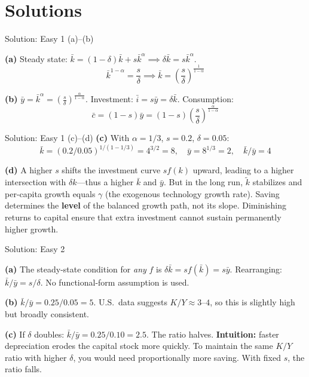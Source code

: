 \documentclass[aspectratio=169,10pt]{beamer}
\newcommand{\backbutton}[1]{\hfill\hyperlink{#1}{\beamerbutton{Back}}}
\begin{document}

\appendix
\section{Solutions}

\begin{frame}{Solution: Easy 1 (a)--(b)}
\hypertarget{s-e1}{}

\textbf{(a)} Steady state: $\bar{k} = (1-\delta)\bar{k} + s\bar{k}^\alpha \implies \delta\bar{k} = s\bar{k}^\alpha$.
\[
\bar{k}^{1-\alpha} = \frac{s}{\delta} \implies \boxed{\bar{k} = \left(\frac{s}{\delta}\right)^{\frac{1}{1-\alpha}}}
\]

\textbf{(b)} $\bar{y} = \bar{k}^\alpha = \left(\frac{s}{\delta}\right)^{\frac{\alpha}{1-\alpha}}$. Investment: $\bar{i} = s\bar{y} = \delta\bar{k}$. Consumption:
\[
\bar{c} = (1-s)\bar{y} = (1-s)\left(\frac{s}{\delta}\right)^{\frac{\alpha}{1-\alpha}}
\]
\end{frame}

\begin{frame}{Solution: Easy 1 (c)--(d)}
\textbf{(c)} With $\alpha=1/3$, $s=0.2$, $\delta=0.05$:
\[
\bar{k} = (0.2/0.05)^{1/(1-1/3)} = 4^{3/2} = 8, \quad \bar{y} = 8^{1/3} = 2, \quad \bar{k}/\bar{y} = 4
\]

\textbf{(d)} A higher $s$ shifts the investment curve $sf(k)$ upward, leading to a higher intersection with $\delta k$---thus a higher $\bar{k}$ and $\bar{y}$. But in the long run, $\tilde{k}$ stabilizes and per-capita growth equals $\gamma$ (the exogenous technology growth rate). Saving determines the \textbf{level} of the balanced growth path, not its slope. Diminishing returns to capital ensure that extra investment cannot sustain permanently higher growth.
\backbutton{q-e1}
\end{frame}

\begin{frame}{Solution: Easy 2}
\hypertarget{s-e2}{}

\textbf{(a)} The steady-state condition for \emph{any} $f$ is $\delta\bar{k} = sf(\bar{k}) = s\bar{y}$. Rearranging: $\bar{k}/\bar{y} = s/\delta$. No functional-form assumption is used.

\medskip
\textbf{(b)} $\bar{k}/\bar{y} = 0.25/0.05 = 5$. U.S.\ data suggests $K/Y \approx 3$--$4$, so this is slightly high but broadly consistent.

\medskip
\textbf{(c)} If $\delta$ doubles: $\bar{k}/\bar{y} = 0.25/0.10 = 2.5$. The ratio halves. \textbf{Intuition:} faster depreciation erodes the capital stock more quickly. To maintain the same $K/Y$ ratio with higher $\delta$, you would need proportionally more saving. With fixed $s$, the ratio falls.
\backbutton{q-e2}
\end{frame}
\end{document}
